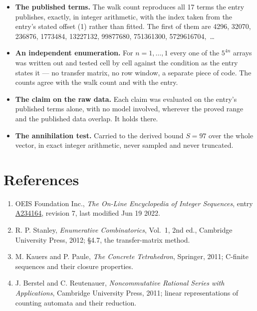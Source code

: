 \documentclass[11pt]{article}
\theoremstyle{definition}
\begin{document}
\begin{itemize}

\item {\bfseries The published terms.} The walk count reproduces all 17 terms the entry publishes, exactly, in integer arithmetic, with the index taken from the entry's stated offset (1) rather than fitted. The first of them are 4296, 32070, 236876, 1773484, 13227132, 99877680, 751361300, 5729616704,~\dots

\item {\bfseries An independent enumeration.} For $n = 1,\dots,1$ every one of the $5^{4n}$ arrays was written out and tested cell by cell against the condition as the entry states it --- no transfer matrix, no row window, a separate piece of code. The counts agree with the walk count and with the entry.

\item {\bfseries The claim on the raw data.} Each claim was evaluated on the entry's published terms alone, with no model involved, wherever the proved range and the published data overlap. It holds there.

\item {\bfseries The annihilation test.} Carried to the derived bound $S = 97$ over the whole vector, in exact integer arithmetic, never sampled and never truncated.

\end{itemize}

\section{References}

\begin{enumerate}

\item OEIS Foundation Inc., \emph{The On-Line Encyclopedia of Integer Sequences}, entry \href{https://oeis.org/A234164}{A234164}, revision 7, last modified Jun 19 2022.

\item R. P. Stanley, \emph{Enumerative Combinatorics}, Vol.~1, 2nd ed., Cambridge University Press, 2012; \S4.7, the transfer-matrix method.

\item M. Kauers and P. Paule, \emph{The Concrete Tetrahedron}, Springer, 2011; C-finite sequences and their closure properties.

\item J. Berstel and C. Reutenauer, \emph{Noncommutative Rational Series with Applications}, Cambridge University Press, 2011; linear representations of counting automata and their reduction.

\end{enumerate}
\end{document}
